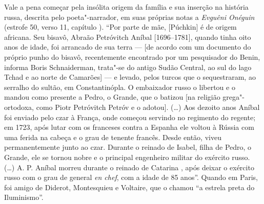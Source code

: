Vale a pena começar pela insólita origem da família e sua inserção na
história russa, descrita pelo poeta"-narrador, em suas próprias notas a
\emph{Evguêni Onéguin} (estrofe 50, verso 11, capítulo ). ``Por parte
de mãe, [Púchkin] é de origem africana. Seu bisavô, Abraão
Petróvitch Aníbal [1696--1781], quando tinha oito anos de idade, foi
arrancado de sua terra --- [de acordo com um documento do próprio punho
do bisavô, recentemente encontrado por um pesquisador do Benin, informa
Boris Schnaiderman, trata"-se do antigo Sudão Central, ao sul do lago
Tchad e ao norte de Camarões] --- e levado, pelos turcos que o
sequestraram, ao serralho do sultão, em Constantinópla. O embaixador
russo o libertou e o mandou como presente a Pedro, o Grande, que o batizou [na religião grega"-ortodoxa, como Piotr
Petróvitch Petróv e o adotou]. (\ldots{}) Aos dezoito anos Aníbal foi enviado pelo czar à França, onde começou servindo no regimento do
regente; em 1723, após lutar com os franceses contra a Espanha ele
voltou à Rússia com uma ferida na cabeça e o grau de tenente francês.
Desde então, viveu permanentemente junto ao czar. Durante o
reinado de Isabel, filha de Pedro, o Grande, ele se tornou nobre e o
principal engenheiro militar do exército russo. (\ldots{}) A. P. Aníbal
morreu durante o reinado de Catarina , após deixar o
exército russo com o grau de general \emph{en chef}, com a idade de 85
anos''. Quando em Paris, foi amigo de Diderot, Montesquieu e Voltaire,
que o chamou ``a estrela preta do Iluminismo''.

